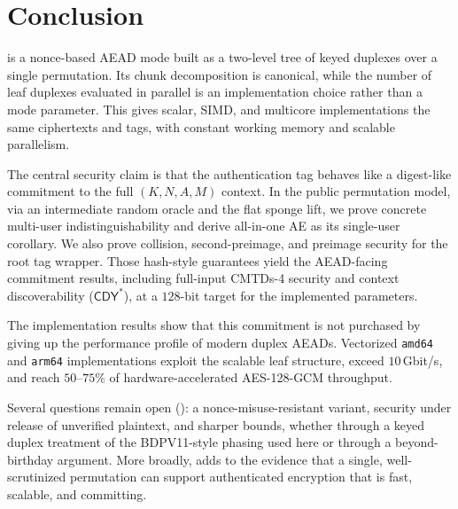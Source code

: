 \section{Conclusion}
\label{sec:conclusion}

\TW{} is a nonce-based AEAD mode built as a two-level tree of keyed duplexes over
a single \Keccakp{} permutation. Its chunk decomposition is canonical, while the
number of leaf duplexes evaluated in parallel is an implementation choice rather
than a mode parameter. This gives scalar, SIMD, and multicore implementations the
same ciphertexts and tags, with constant working memory and scalable
parallelism.

The central security claim is that the authentication tag behaves like a
digest-like commitment to the full $(K, N, A, M)$ context. In the public
permutation model, via an intermediate random oracle and the flat sponge lift, we
prove concrete multi-user indistinguishability and derive all-in-one AE as its
single-user corollary. We also prove collision, second-preimage, and preimage
security for the root tag wrapper. Those hash-style guarantees yield the
AEAD-facing commitment results, including full-input \textsf{CMTDs-4} security
and context discoverability ($\mathsf{CDY}^\ast$), at a $128$-bit target for the
implemented parameters.

The implementation results show that this commitment is not purchased by giving
up the performance profile of modern duplex AEADs. Vectorized \texttt{amd64} and
\texttt{arm64} implementations exploit the scalable leaf structure, exceed
$10$\,Gbit/s, and reach $50$--$75\%$ of hardware-accelerated AES-128-GCM
throughput.

Several questions remain open (): a nonce-misuse-resistant
variant, security under release of unverified plaintext, and sharper bounds,
whether through a keyed duplex treatment of the BDPV11-style phasing used here or
through a beyond-birthday argument. More broadly, \TW{} adds to the evidence that
a single, well-scrutinized \Keccak{} permutation can support authenticated
encryption that is fast, scalable, and committing.
